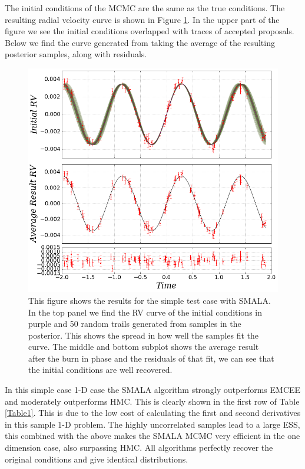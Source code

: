 \documentclass{aa}
\begin{document}
The initial conditions of the MCMC are the same as the true conditions. The resulting radial velocity curve is shown in Figure \ref{FigSimple}. In the upper part of the figure we see the initial conditions overlapped with traces of accepted proposals. Below we find the curve generated from taking the average of the resulting posterior samples, along with residuals.

\begin{figure}
\centering
\includegraphics[width=0.95\hsize]{rv1-1.png}
   \caption{This figure shows the results for the simple test case with SMALA. In the top panel we find the RV curve of the initial conditions in purple and 50 random trails generated from samples in the posterior. This shows the spread in how well the samples fit the curve. The middle and bottom subplot shows the average result after the burn in phase and the residuals of that fit, we can see that the initial conditions are well recovered.}
      \label{FigSimple}
\end{figure}

In this simple case 1-D case the SMALA algorithm strongly outperforms EMCEE and moderately outperforms HMC. This is clearly shown in the first row of Table \ref{Table1}. This is due to the low cost of calculating the first and second derivatives in this sample 1-D problem. The highly uncorrelated samples lead to a large ESS, this combined with the above makes the SMALA MCMC very efficient in the one dimension case, also surpassing HMC. All algorithms perfectly recover the original conditions and give identical distributions.
\end{document}
